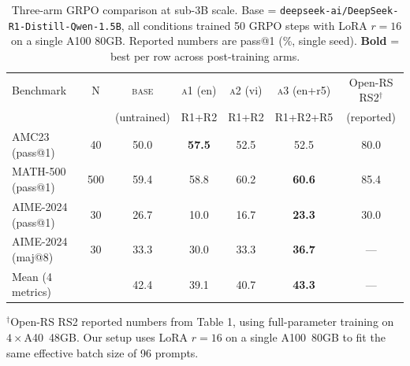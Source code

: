 \begin{table}[t]
\centering
\small
\caption{Three-arm GRPO comparison at sub-3B scale. Base = \texttt{deepseek-ai/DeepSeek-R1-Distill-Qwen-1.5B}, all conditions trained 50 GRPO steps with LoRA $r{=}16$ on a single A100 80GB. Reported numbers are pass@1 (\%, single seed). \textbf{Bold} = best per row across post-training arms.}
\label{tab:three_arm_results}
\begin{tabular}{lcccccc}
\toprule
Benchmark & N & \textsc{base} & \textsc{a1} (en) & \textsc{a2} (vi) & \textsc{a3} (en+r5) & Open-RS RS2$^\dagger$ \\
 & & (untrained) & R1+R2 & R1+R2 & R1+R2+R5 & (reported) \\
\midrule
AMC23 (pass@1)        & 40  & 50.0 & \textbf{57.5} & 52.5 & 52.5 & 80.0 \\
MATH-500 (pass@1)     & 500 & 59.4 & 58.8 & 60.2 & \textbf{60.6} & 85.4 \\
AIME-2024 (pass@1)    & 30  & 26.7 & 10.0 & 16.7 & \textbf{23.3} & 30.0 \\
AIME-2024 (maj@8)     & 30  & 33.3 & 30.0 & 33.3 & \textbf{36.7} & --- \\
\midrule
Mean (4 metrics)      &     & 42.4 & 39.1 & 40.7 & \textbf{43.3} & --- \\
\bottomrule
\end{tabular}

\medskip
\footnotesize
$^\dagger$Open-RS RS2 reported numbers from \citet{openRS_2025} Table 1, using full-parameter
training on $4{\times}$A40~48GB. Our setup uses LoRA $r{=}16$ on a single A100~80GB
to fit the same effective batch size of 96 prompts.
\end{table}
